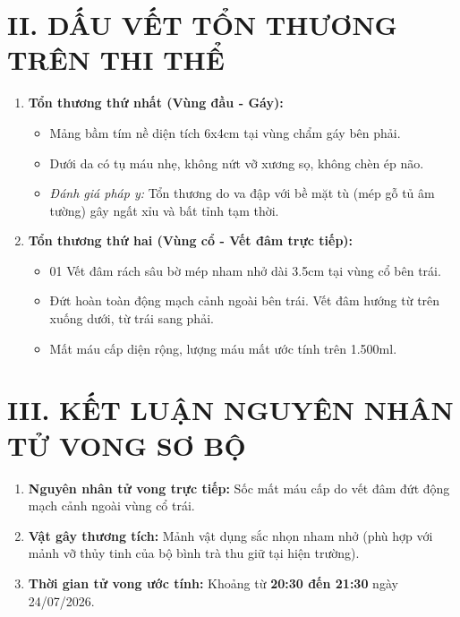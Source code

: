 \documentclass[12pt,a4paper]{article}
\begin{document}
\section*{II. DẤU VẾT TỔN THƯƠNG TRÊN THI THỂ}
\begin{enumerate}[label=\arabic*., leftmargin=1.5cm]
    \item \textbf{Tổn thương thứ nhất (Vùng đầu - Gáy):}
    \begin{itemize}[leftmargin=0.8cm]
        \item Mảng bầm tím nề diện tích 6x4cm tại vùng chẩm gáy bên phải.
        \item Dưới da có tụ máu nhẹ, không nứt vỡ xương sọ, không chèn ép não.
        \item \textit{Đánh giá pháp y:} Tổn thương do va đập với bề mặt tù (mép gỗ tủ âm tường) gây ngất xỉu và bất tỉnh tạm thời.
    \end{itemize}

    \item \textbf{Tổn thương thứ hai (Vùng cổ - Vết đâm trực tiếp):}
    \begin{itemize}[leftmargin=0.8cm]
        \item 01 Vết đâm rách sâu bờ mép nham nhở dài 3.5cm tại vùng cổ bên trái.
        \item Đứt hoàn toàn động mạch cảnh ngoài bên trái. Vết đâm hướng từ trên xuống dưới, từ trái sang phải.
        \item Mất máu cấp diện rộng, lượng máu mất ước tính trên 1.500ml.
    \end{itemize}
\end{enumerate}

\section*{III. KẾT LUẬN NGUYÊN NHÂN TỬ VONG SƠ BỘ}
\begin{enumerate}[label=\arabic*., leftmargin=1.5cm]
    \item \textbf{Nguyên nhân tử vong trực tiếp:} Sốc mất máu cấp do vết đâm đứt động mạch cảnh ngoài vùng cổ trái.
    \item \textbf{Vật gây thương tích:} Mảnh vật dụng sắc nhọn nham nhở (phù hợp với mảnh vỡ thủy tinh của bộ bình trà thu giữ tại hiện trường).
    \item \textbf{Thời gian tử vong ước tính:} Khoảng từ \textbf{20:30 đến 21:30} ngày 24/07/2026.
\end{enumerate}

\vspace{0.8cm}
\end{document}
